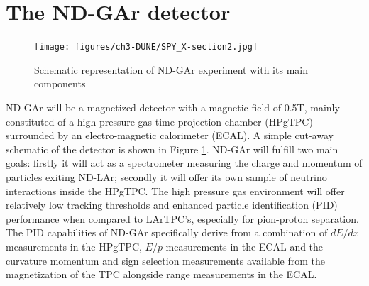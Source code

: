 \section{The ND-GAr detector}
\label{sec:DUNE-ND-GAr}

\begin{figure}[t]
     \centering
     \texttt{[image: figures/ch3-DUNE/SPY\_X-section2.jpg]}
     \caption{Schematic representation of ND-GAr experiment with its main components}
        \label{fig:ND-G}
\end{figure}

ND-GAr will be a magnetized detector with a magnetic field of 0.5T, mainly constituted of a high pressure gas time projection chamber (HPgTPC) surrounded by an electro-magnetic calorimeter (ECAL). A simple cut-away schematic of the detector is shown in Figure \ref{fig:ND-G}. ND-GAr will fulfill two main goals: firstly it will act as a spectrometer measuring the charge and momentum of particles exiting ND-LAr; secondly it will offer its own sample of neutrino interactions inside the HPgTPC. The high pressure gas environment will offer relatively low tracking thresholds and enhanced particle identification (PID) performance when compared to LArTPC's, especially for pion-proton separation. The PID capabilities of ND-GAr specifically derive from a combination of $dE/dx$ measurements in the HPgTPC, $E/p$ measurements in the ECAL and the curvature momentum and sign selection measurements available from the magnetization of the TPC alongside range measurements in the ECAL.


